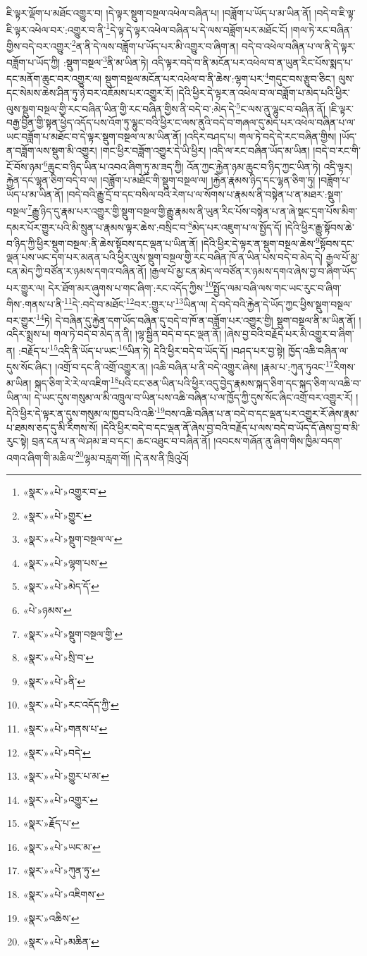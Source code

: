 ཇི་ལྟར་ལྡོག་པ་མཐོང་འགྱུར་བ། །དེ་ལྟར་སྡུག་བསྔལ་འཕེལ་བཞིན་པ། །བཟློག་པ་ཡོད་པ་མ་ཡིན་ནོ། །བདེ་བ་ཇི་ལྟ་ཇི་ལྟར་འཕེལ་བར་:འགྱུར་བ་ནི་\footnote{«སྣར་»«པེ་»འགྱུར་བ་}དེ་ལྟ་དེ་ལྟར་འཕེལ་བཞིན་པ་དེ་ལས་བཟློག་པར་མཐོང་ངོ། །གལ་ཏེ་རང་བཞིན་གྱིས་བདེ་བར་འགྱུར་\footnote{«སྣར་»«པེ་»གྱུར་}ན་ནི་དེ་ལས་བཟློག་པ་ཡོད་པར་མི་འགྱུར་བ་ཞིག་ན། བདེ་བ་འཕེལ་བཞིན་པ་ལ་ནི་དེ་ལྟར་བཟློག་པ་ཡོད་ཀྱི། :སྡུག་བསྔལ་\footnote{«སྣར་»«པེ་»སྡུག་བསྔལ་ལ་}ནི་མ་ཡིན་ཏེ། འདི་ལྟར་བདེ་བ་ནི་མངོན་པར་འཕེལ་བ་ན་ཡུན་རིང་པོས་སྨད་པ་དང་མནོག་ཆུང་བར་འགྱུར་ལ། སྡུག་བསྔལ་མངོན་པར་འཕེལ་བ་ནི་ཆེས་:ལྷག་པར་\footnote{«སྣར་»«པེ་»ལྷག་པས་}གདུང་བས་རྩུབ་ཅིང་། ལུས་དང་སེམས་ཆེས་ཤིན་ཏུ་ཉེ་བར་འཇོམས་པར་འགྱུར་རོ། །དེའི་ཕྱིར་དེ་ལྟར་ན་འཕེལ་བ་ལ་བཟློག་པ་མེད་པའི་ཕྱིར་ལུས་སྡུག་བསྔལ་གྱི་རང་བཞིན་ཡིན་གྱི་རང་བཞིན་གྱིས་ནི་བདེ་བ་:མེད་དེ་\footnote{«སྣར་»«པེ་»མེད་དོ་}ང་ལས་ནུ་ལྷུང་བ་བཞིན་ནོ། །ཇི་ལྟར་བརྒྱ་བྱིན་གྱི་སྟན་ཕྱེད་འདོད་པས་འོག་ཏུ་ལྷུང་བའི་ཕྱིར་ང་ལས་ནུའི་བདེ་བ་གཞལ་དུ་མེད་པར་འཕེལ་བཞིན་པ་ལ་ཡང་བཟློག་པ་མཐོང་བ་དེ་ལྟར་སྡུག་བསྔལ་ལ་མ་ཡིན་ནོ། །འདིར་བཤད་པ། གལ་ཏེ་བདེ་དེ་རང་བཞིན་གྱིས། །ཡོད་ན་བཟློག་ལས་སྡུག་མི་འགྱུར། །གང་ཕྱིར་བཟློག་འགྱུར་དེ་ཡི་ཕྱིར། །འདི་ལ་རང་བཞིན་ཡོད་མ་ཡིན། །བདེ་བ་རང་གི་ངོ་བོས་ཉམ་\footnote{«པེ་»ཉམས་}ཆུང་བ་ཉིད་ཡིན་པ་འབའ་ཞིག་ཏུ་མ་ཟད་ཀྱི། འོན་ཀྱང་རྐྱེན་ཉམ་ཆུང་བ་ཉིད་ཀྱང་ཡིན་ཏེ། འདི་ལྟར། རྐྱེན་དང་ལྷན་ཅིག་བདེ་བ་ལ། །བཟློག་པ་མཐོང་གི་སྡུག་བསྔལ་ལ། །རྐྱེན་རྣམས་ཉིད་དང་ལྷན་ཅིག་ཏུ། །བཟློག་པ་ཡོད་པ་མ་ཡིན་ནོ། །བདེ་བའི་རྒྱུ་དྲོ་བ་དང་བསིལ་བའི་རེག་པ་ལ་སོགས་པ་རྣམས་ནི་བསྟེན་པ་ན་མཐར་:སྡུག་བསྔལ་\footnote{«སྣར་»«པེ་»སྡུག་བསྔལ་གྱི་}རྒྱུ་ཉིད་དུ་རྣམ་པར་འགྱུར་གྱི་སྡུག་བསྔལ་གྱི་རྒྱུ་རྣམས་ནི་ཡུན་རིང་པོས་བསྟེན་པ་ན་ཞེ་སྡང་དྲག་པོས་མིག་དམར་པོར་གྱུར་པའི་མི་སྲུན་པ་རྣམས་ལྟར་ཆེས་:བསྲིང་བ་\footnote{«སྣར་»«པེ་»སྲི་བ་}མེད་པར་འཇུག་པ་ལ་སྤྱོད་དོ། །དེའི་ཕྱིར་རྒྱུ་སྟོབས་ཆེ་བ་ཉིད་ཀྱི་ཕྱིར་སྡུག་བསྔལ་:ནི་ཆེས་སྟོབས་དང་ལྡན་པ་ཡིན་ནོ། །དེའི་ཕྱིར་དེ་ལྟར་ན་སྡུག་བསྔལ་ཆེས་\footnote{«སྣར་»«པེ་»ནི་}སྟོབས་དང་ལྡན་པས་ཡང་དག་པར་མནན་པའི་ཕྱིར་ལུས་སྡུག་བསྔལ་གྱི་རང་བཞིན་ཁོ་ན་ཡིན་པས་བདེ་བ་མེད་དེ། རྒྱལ་པོ་མྱ་ངན་མེད་ཀྱི་བཙོན་ར་ཉམས་དགའ་བཞིན་ནོ། །རྒྱལ་པོ་མྱ་ངན་མེད་ལ་བཙོན་ར་ཉམས་དགའ་ཞེས་བྱ་བ་ཞིག་ཡོད་པར་གྱུར་ལ། དེར་ཐོག་མར་ཞུགས་པ་གང་ཞིག་:རང་འདོད་ཀྱིས་\footnote{«སྣར་»«པེ་»རང་འདོད་ཀྱི་}སྤྱོད་ལམ་བཞི་ལས་གང་ཡང་རུང་བ་ཞིག་གིས་:གནས་པ་ནི་\footnote{«སྣར་»«པེ་»གནས་པ་}དེ་:བདེ་བ་མཐོང་\footnote{«སྣར་»«པེ་»བདེ་}བར་:གྱུར་པ་\footnote{«སྣར་»«པེ་»གྱུར་པ་མ་}ཡིན་ལ། དེ་བདེ་བའི་རྐྱེན་དེ་ཡོད་ཀྱང་ཕྱིས་སྡུག་བསྔལ་བར་གྱུར་\footnote{«སྣར་»«པེ་»འགྱུར་}ཏེ། དེ་བཞིན་དུ་རྐྱེན་དག་ཡོད་བཞིན་དུ་བདེ་བ་ཁོ་ན་བཟློག་པར་འགྱུར་གྱི། སྡུག་བསྔལ་ནི་མ་ཡིན་ནོ། །འདིར་སྨྲས་པ། གལ་ཏེ་བདེ་བ་མེད་ན་ནི། །ལྷ་སྦྱིན་བདེ་བ་དང་ལྡན་ནོ། །ཞེས་བྱ་བའི་བརྗོད་པར་མི་འགྱུར་བ་ཞིག་ན། :བརྗོད་པ་\footnote{«སྣར་»རྗོད་པ་}འདི་ནི་ཡོད་པ་ཡང་\footnote{«སྣར་»«པེ་»ཡང་མ་}ཡིན་ཏེ། དེའི་ཕྱིར་བདེ་བ་ཡོད་དོ། །བཤད་པར་བྱ་སྟེ། ཁྱོད་འཆི་བཞིན་ལ་དུས་སོང་ཞིང་། །འགྲོ་བ་དང་ནི་འགྲོ་འགྱུར་ན། །འཆི་བཞིན་པ་ནི་བདེ་འགྱུར་ཞེས། །རྣམ་པ་:ཀུན་ཏུའང་\footnote{«སྣར་»«པེ་»ཀུན་ཏུ་}རིགས་མ་ཡིན། སྐད་ཅིག་རེ་རེ་ལ་འཇིག་\footnote{«སྣར་»«པེ་»འཇིགས་}པའི་ངང་ཅན་ཡིན་པའི་ཕྱིར་འདུ་བྱེད་རྣམས་སྐད་ཅིག་དང་སྐད་ཅིག་ལ་འཆི་བ་ཡིན་ལ། དེ་ཡང་དུས་གསུམ་ལ་མི་འཁྲུལ་བ་ཡིན་པས་འཆི་བཞིན་པ་ལ་ཁྱོད་ཀྱི་དུས་སོང་ཞིང་འགྲོ་བར་འགྱུར་རོ། །དེའི་ཕྱིར་དེ་ལྟར་ན་དུས་གསུམ་ལ་ཁྱབ་པའི་འཆི་\footnote{«སྣར་»འཆིས་}བས་འཆི་བཞིན་པ་ན་བདེ་བ་དང་ལྡན་པར་འགྱུར་རོ་ཞེས་རྣམ་པ་ཐམས་ཅད་དུ་མི་རིགས་སོ། །དེའི་ཕྱིར་བདེ་བ་དང་ལྡན་ནོ་ཞེས་བྱ་བའི་བརྗོད་པ་ལས་བདེ་བ་ཡོད་དོ་ཞེས་བྱ་བ་མི་རུང་སྟེ། བྲན་ངན་པ་ན་ལེ་ཤམ་ཟ་བ་དང་། ཆང་འཐུང་བ་བཞིན་ནོ། །འབངས་གཞོན་ནུ་ཞིག་གིས་ཁྱིམ་བདག་འགའ་ཞིག་གི་མཆིལ་\footnote{«སྣར་»«པེ་»མཆིན་}ལྷམ་བརླག་གོ། །དེ་ནས་ནི་ཁྲིའུའོ། 